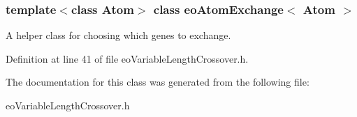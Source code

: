\subsubsection*{template$<$class Atom$>$ class eo\-Atom\-Exchange$<$ Atom $>$}

A helper class for choosing which genes to exchange. 



Definition at line 41 of file eo\-Variable\-Length\-Crossover.h.

The documentation for this class was generated from the following file:\begin{CompactItemize}
\item 
eo\-Variable\-Length\-Crossover.h\end{CompactItemize}
